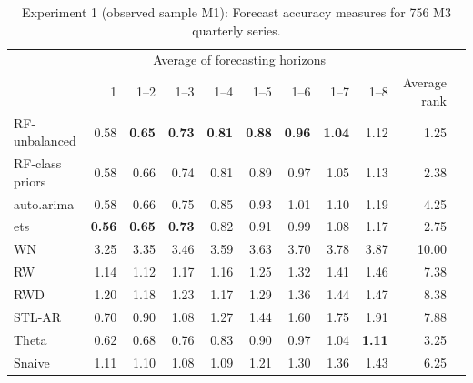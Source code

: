 \documentclass[11pt,a4paper,]{article}
\theoremstyle{definition}
\theoremstyle{definition}
\theoremstyle{definition}
\theoremstyle{remark}
\begin{document}
\begin{table}[!h]
\centering\small
\caption{Experiment 1 (observed sample M1): Forecast accuracy measures for 756 M3 quarterly series.}
\label{M3Q}
\begin{tabular}{lrrrrrrrrrl}
\toprule
 & \multicolumn{8}{c|}{Average of forecasting horizons}    &  \\ 
                & 1         & 1--2      & 1--3      & 1--4      & 1--5      & 1--6      & 1--7      & 1--8      & Average rank  \\
\midrule
RF-unbalanced   & 0.58      & \bf{0.65} & \bf{0.73} & \bf{0.81} & \bf{0.88} & \bf{0.96} & \bf{1.04} & 1.12      & 1.25  \\
RF-class priors & 0.58      & 0.66      & 0.74      & 0.81      & 0.89      & 0.97      & 1.05      & 1.13      & 2.38   \\
auto.arima      & 0.58      & 0.66      & 0.75      & 0.85      & 0.93      & 1.01      & 1.10      & 1.19      & 4.25 \\
ets             & \bf{0.56} & \bf{0.65} & \bf{0.73} & 0.82      & 0.91      & 0.99      & 1.08      & 1.17      & 2.75   \\
WN              & 3.25      & 3.35      & 3.46      & 3.59      & 3.63      & 3.70      & 3.78      & 3.87      & 10.00   \\
RW              & 1.14      & 1.12      & 1.17      & 1.16      & 1.25      & 1.32      & 1.41      & 1.46      & 7.38  \\
RWD             & 1.20      & 1.18      & 1.23      & 1.17      & 1.29      & 1.36      & 1.44      & 1.47      & 8.38   \\
STL-AR          & 0.70      & 0.90      & 1.08      & 1.27      & 1.44      & 1.60      & 1.75      & 1.91      & 7.88   \\
Theta           & 0.62      & 0.68      & 0.76      & 0.83      & 0.90      & 0.97      & 1.04      & \bf{1.11} & 3.25  \\
Snaive          & 1.11      & 1.10      & 1.08      & 1.09      & 1.21      & 1.30      & 1.36      & 1.43      & 6.25  \\
\bottomrule
\end{tabular}
\end{table}

\clearpage
\end{document}

